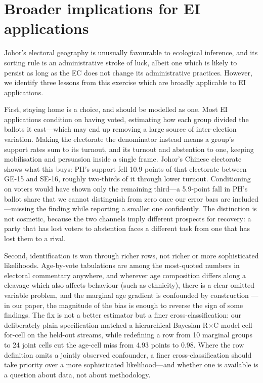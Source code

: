 \documentclass[11pt]{article}
\begin{document}
\section{Broader implications for EI applications}
\label{sec:implications}

Johor's electoral geography is unusually favourable to ecological inference, and its sorting rule is an administrative stroke of luck, albeit one which is likely to persist as long as the EC does not change its administrative practices. However, we identify three lessons from this exercise which are broadly applicable to EI applications.

First, staying home is a choice, and should be modelled as one. Most EI applications condition on having voted, estimating how each group divided the ballots it cast---which may end up removing a large source of inter-election variation. Making the electorate the denominator instead means a group's support rates sum to its turnout, and its turnout and abstention to one, keeping mobilisation and persuasion inside a single frame. Johor's Chinese electorate shows what this buys: PH's support fell 10.9 points of that electorate between GE-15 and SE-16, roughly two-thirds of it through lower turnout. Conditioning on voters would have shown only the remaining third---a 5.9-point fall in PH's ballot share that we cannot distinguish from zero once our error bars are included---missing the finding while reporting a smaller one confidently. The distinction is not cosmetic, because the two channels imply different prospects for recovery: a party that has lost voters to abstention faces a different task from one that has lost them to a rival.

Second, identification is won through richer rows, not richer or more sophisticated likelihoods. Age-by-vote tabulations are among the most-quoted numbers in electoral commentary anywhere, and wherever age composition differs along a cleavage which also affects behaviour (such as ethnicity), there is a clear omitted variable problem, and the marginal age gradient is confounded by construction \cite{achenshively1995,chen2026}---in our paper, the magnitude of the bias is enough to reverse the sign of some findings. The fix is not a better estimator but a finer cross-classification: our deliberately plain specification matched a hierarchical Bayesian R$\times$C model cell-for-cell on the held-out streams, while redefining a row from 10 marginal groups to 24 joint cells cut the age-cell miss from 4.93 points to 0.98. Where the row definition omits a jointly observed confounder, a finer cross-classification should take priority over a more sophisticated likelihood---and whether one is available is a question about data, not about methodology.
\end{document}
